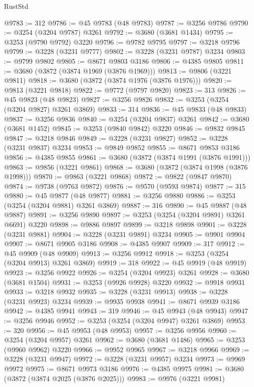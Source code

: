 \begin{lexlean}{RustStd}
\begin{coremodule}
@9783 := 312
@9786 := @45 @9783 (@48 @9783)
@9787 := @3256 @9786
@9790 := @3254 (@3204 @9787) @3261
@9792 := @3680 (@3681 @1434)
@9795 := @3253 (@9790 @9792) @3220
@9796 := @9782 @9795
@9797 := @3218 @9796
@9799 := @3228 (@3231 @9777)
@9802 := @3228 (@3231 @9787) @3234
@9803 := @9799 @9802
@9805 := @8671 @9803 @3186
@9806 := @4385 @9805
@9811 := @3680 (@3872 (@3874 @1969 (@3876 @1969)))
@9813 := @9806 (@3221 @9811)
@9818 := @3680 (@3872 (@3874 @1976 (@3876 @1976)))
@9820 := @9813 (@3221 @9818)
@9822 := @9772 (@9797 @9820)
@9823 := 313
@9826 := @45 @9823 (@48 @9823)
@9827 := @3256 @9826
@9832 := @3253 (@3254 (@3204 @9827) @3261 @3869)
@9833 := 314
@9836 := @45 @9833 (@48 @9833)
@9837 := @3256 @9836
@9840 := @3254 (@3204 @9837) @3261
@9842 := @3680 (@3681 @1452)
@9845 := @3253 (@9840 @9842) @3220
@9846 := @9832 @9845
@9847 := @3218 @9846
@9849 := @3228 (@3231 @9827)
@9852 := @3228 (@3231 @9837) @3234
@9853 := @9849 @9852
@9855 := @8671 @9853 @3186
@9856 := @4385 @9855
@9861 := @3680 (@3872 (@3874 @1991 (@3876 @1991)))
@9863 := @9856 (@3221 @9861)
@9868 := @3680 (@3872 (@3874 @1998 (@3876 @1998)))
@9870 := @9863 (@3221 @9868)
@9872 := @9822 (@9847 @9870)
@9874 := @9738 (@9763 @9872)
@9876 := @9570 (@9593 @9874)
@9877 := 315
@9880 := @45 @9877 (@48 @9877)
@9881 := @3256 @9880
@9886 := @3253 (@3254 (@3204 @9881) @3261 @3869)
@9887 := 316
@9890 := @45 @9887 (@48 @9887)
@9891 := @3256 @9890
@9897 := @3253 (@3254 (@3204 @9891) @3261 @6691) @3220
@9898 := @9886 @9897
@9899 := @3218 @9898
@9901 := @3228 (@3231 @9881)
@9904 := @3228 (@3231 @9891) @3234
@9905 := @9901 @9904
@9907 := @8671 @9905 @3186
@9908 := @4385 @9907
@9909 := 317
@9912 := @45 @9909 (@48 @9909)
@9913 := @3256 @9912
@9918 := @3253 (@3254 (@3204 @9913) @3261 @3869)
@9919 := 318
@9922 := @45 @9919 (@48 @9919)
@9923 := @3256 @9922
@9926 := @3254 (@3204 @9923) @3261
@9928 := @3680 (@3681 @1504)
@9931 := @3253 (@9926 @9928) @3220
@9932 := @9918 @9931
@9933 := @3218 @9932
@9935 := @3228 (@3231 @9913)
@9938 := @3228 (@3231 @9923) @3234
@9939 := @9935 @9938
@9941 := @8671 @9939 @3186
@9942 := @4385 @9941
@9943 := 319
@9946 := @45 @9943 (@48 @9943)
@9947 := @3256 @9946
@9952 := @3253 (@3254 (@3204 @9947) @3261 @3869)
@9953 := 320
@9956 := @45 @9953 (@48 @9953)
@9957 := @3256 @9956
@9960 := @3254 (@3204 @9957) @3261
@9962 := @3680 (@3681 @1486)
@9965 := @3253 (@9960 @9962) @3220
@9966 := @9952 @9965
@9967 := @3218 @9966
@9969 := @3228 (@3231 @9947)
@9972 := @3228 (@3231 @9957) @3234
@9973 := @9969 @9972
@9975 := @8671 @9973 @3186
@9976 := @4385 @9975
@9981 := @3680 (@3872 (@3874 @2025 (@3876 @2025)))
@9983 := @9976 (@3221 @9981)

\end{coremodule}
\end{lexlean}

